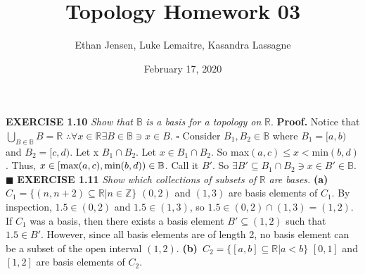 \documentclass[12pt]{article}
\title{Topology Homework 03}
\author{Ethan Jensen, Luke Lemaitre, Kasandra Lassagne}
\date{February 17, 2020}
\begin{document}
	\maketitle
	\noindent
	\textbf{EXERCISE 1.10}
	\textit{Show that} \(\mathbb{B}\) \textit{is a basis for a topology on} \(\mathbb{R}\). \newline \newline
	\textbf{Proof.} \newline
	Notice that \(\bigcup_{B \in \mathbb{B}}B = \mathbb{R}\)
	\newline
	\(\therefore \forall x \in \mathbb{R} \exists B \in \mathbb{B}  \ni x \in B\).
	\newline \(\square\) \newline
	Consider \(B_1, B_2 \in \mathbb{B}\) where \(B_1 = [a,b)\) and \(B_2 = [c,d)\). \newline
	Let x \in \(B_1 \cap B_2\).
	\newline
	Let \(x \in B_1 \cap B_2\). \newline
	So max\((a,c) \leq x <\)min\((b,d)\).
	\newline
	Thus, \(x \in [\textup{max}(a,c), \textup{min}(b,d)) \in \mathbb{B}\). Call it \(B'\). \newline
	So \(\exists B' \subseteq B_1 \cap B_2 \ni x \in B' \in \mathbb{B}\).
	\newline \(\blacksquare\)
	\newpage
	\noindent
	\textbf{EXERCISE 1.11} \textit{Show which collections of subsets of} \(\mathbb{R}\) \textit{are bases.}
	\newline \newline
	\textbf{(a)} \(C_1 = \{(n,n+2) \subseteq \mathbb{R} | n \in \mathbb{Z}\}\) \newline
	\((0,2)\) and \((1,3)\) are basis elements of \(C_1\). \newline
	By inspection, \(1.5 \in (0,2)\) and \(1.5 \in (1,3)\), so \(1.5 \in (0,2) \cap (1,3) = (1,2)\). \newline
	If \(C_1\) was a basis, then there exists a basis element \(B' \subseteq (1,2)\) such that \(1.5 \in B'\). \newline
	However, since all basis elements are of length 2, no basis element can be a subset of the open interval \((1,2)\). \newline
	\newline
	\textbf{(b)}\ \(C_2 = \{[a,b] \subseteq \mathbb{R}| a < b\}\)
	\newline
	\([0,1]\) and \([1,2]\) are basis elements of \(C_2\).
	\newline
\end{document}
